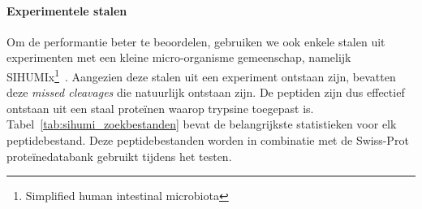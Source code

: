 \paragraph{Experimentele stalen}
Om de performantie beter te beoordelen, gebruiken we ook enkele stalen uit experimenten met een kleine micro-organisme gemeenschap, namelijk SIHUMIx\footnote{Simplified human intestinal microbiota}~\cite{SIHUMI_first_introduction, SIHUMI_frequently_used}.
Aangezien deze stalen uit een experiment ontstaan zijn, bevatten deze \textit{missed cleavages} die natuurlijk ontstaan zijn.
De peptiden zijn dus effectief ontstaan uit een staal proteïnen waarop trypsine toegepast is.
Tabel~\ref{tab:sihumi_zoekbestanden} bevat de belangrijkste statistieken voor elk peptidebestand.
Deze peptidebestanden worden in combinatie met de Swiss-Prot proteïnedatabank gebruikt tijdens het testen.

